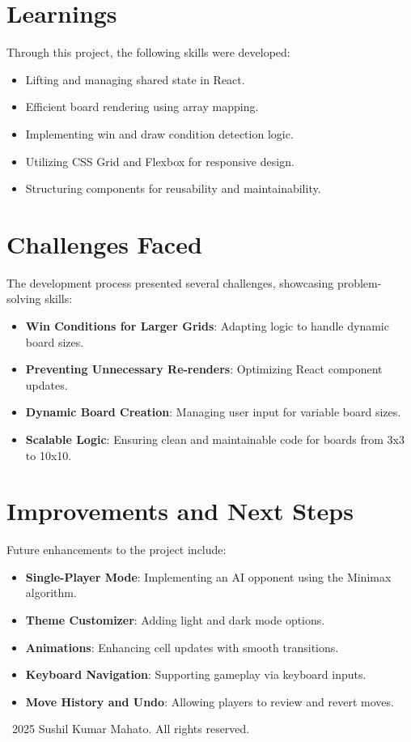 \documentclass[a4paper,12pt]{article}
\begin{document}
\section{Learnings}
Through this project, the following skills were developed:
\begin{itemize}
    \item Lifting and managing shared state in React.
    \item Efficient board rendering using array mapping.
    \item Implementing win and draw condition detection logic.
    \item Utilizing CSS Grid and Flexbox for responsive design.
    \item Structuring components for reusability and maintainability.
\end{itemize}

\section{Challenges Faced}
The development process presented several challenges, showcasing problem-solving skills:
\begin{itemize}
    \item \textbf{Win Conditions for Larger Grids}: Adapting logic to handle dynamic board sizes.
    \item \textbf{Preventing Unnecessary Re-renders}: Optimizing React component updates.
    \item \textbf{Dynamic Board Creation}: Managing user input for variable board sizes.
    \item \textbf{Scalable Logic}: Ensuring clean and maintainable code for boards from 3x3 to 10x10.
\end{itemize}

\section{Improvements and Next Steps}
Future enhancements to the project include:
\begin{itemize}
    \item \textbf{Single-Player Mode}: Implementing an AI opponent using the Minimax algorithm.
    \item \textbf{Theme Customizer}: Adding light and dark mode options.
    \item \textbf{Animations}: Enhancing cell updates with smooth transitions.
    \item \textbf{Keyboard Navigation}: Supporting gameplay via keyboard inputs.
    \item \textbf{Move History and Undo}: Allowing players to review and revert moves.
\end{itemize}

\clearpage
\begin{center}
    \vspace*{\fill}
    \small
    \textcopyright~2025 Sushil Kumar Mahato. All rights reserved.
\end{center}
\end{document}

